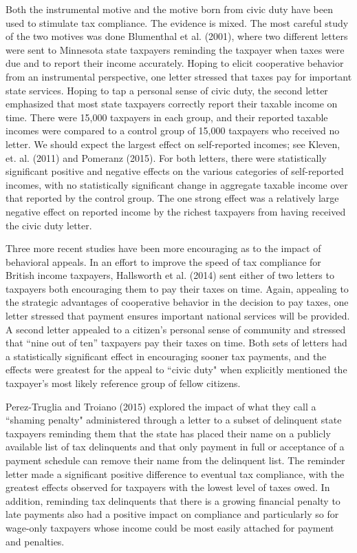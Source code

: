 \documentclass[12pt,titlepage]{article}
\begin{document}
Both the instrumental motive and the motive born from civic duty have
been used to stimulate tax compliance.  The evidence is mixed.  The
most careful study of the two motives was done Blumenthal et
al. (2001), where two different letters were sent to Minnesota state
taxpayers reminding the taxpayer when taxes were due and to report
their income accurately.  Hoping to elicit cooperative behavior from 
an instrumental perspective, one letter stressed that taxes pay for 
important state services.  Hoping to tap a personal sense of civic 
duty, the second letter emphasized that most state
taxpayers correctly report their taxable income on time.  There were
15,000 taxpayers in each group, and their reported taxable incomes
were compared to a control group of 15,000 taxpayers who received no 
letter.  We should expect the largest effect on self-reported 
incomes; see Kleven, et. al. (2011) and Pomeranz (2015).   For both
letters, there were statistically significant positive and negative
effects on the various categories of self-reported incomes, with no
statistically significant change in aggregate taxable income over that
reported by the control group.  The one strong effect was a relatively
large negative effect on reported income by the richest taxpayers from
having received the civic duty letter.

Three more recent studies have been more encouraging as to the impact of
behavioral appeals. In an effort to improve the speed of tax
compliance for British income taxpayers, Hallsworth et al. (2014)
sent either of two letters to taxpayers both encouraging them to pay 
their taxes on time.  Again, appealing to the strategic advantages of 
cooperative behavior in the decision to pay taxes, one letter stressed 
that payment ensures important national services will be provided.  
A second letter appealed to a citizen’s personal sense of community 
and stressed that “nine out of ten” taxpayers pay their taxes on time.
Both sets of letters had a statistically significant effect in encouraging
sooner tax payments, and the effects were greatest for the appeal to
``civic duty" when explicitly mentioned the taxpayer's most likely
reference group of fellow citizens.

Perez-Truglia and Troiano (2015) explored the impact of what they call
a ``shaming penalty" administered through a letter to a subset of
delinquent state taxpayers reminding them that the state has placed
their name on a publicly available list of tax delinquents and that
only payment in full or acceptance of a payment schedule can remove
their name from the delinquent list.  The reminder letter made a
significant positive difference to eventual tax compliance, with the
greatest effects observed for taxpayers with the lowest level of taxes
owed.  In addition, reminding tax delinquents that there is a growing
financial penalty to late payments also had a positive impact on
compliance and particularly so for wage-only taxpayers whose income
could be most easily attached for payment and penalties.
\end{document}
